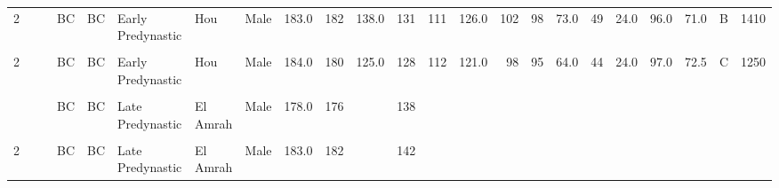 \begin{table}[p]
{\begin{tabular}{rrrlllllrrrrrrrrrrrrrlr}
2 &  &  & BC & BC & Early Predynastic & Hou & Male & 183.0 & 182 & 138.0 & 131 & 111 & 126.0 & 102 & 98 & 73.0 & 49 & 24.0 & 96.0 & 71.0 & B & 1410\\
\cellcolor{gray!10}{2} & \cellcolor{gray!10}{} & \cellcolor{gray!10}{} & \cellcolor{gray!10}{BC} & \cellcolor{gray!10}{BC} & \cellcolor{gray!10}{Early Predynastic} & \cellcolor{gray!10}{Hou} & \cellcolor{gray!10}{Male} & \cellcolor{gray!10}{183.0} & \cellcolor{gray!10}{180} & \cellcolor{gray!10}{140.0} & \cellcolor{gray!10}{137} & \cellcolor{gray!10}{127} & \cellcolor{gray!10}{133.0} & \cellcolor{gray!10}{103} & \cellcolor{gray!10}{103} & \cellcolor{gray!10}{74.0} & \cellcolor{gray!10}{52} & \cellcolor{gray!10}{22.0} & \cellcolor{gray!10}{100.0} & \cellcolor{gray!10}{69.0} & \cellcolor{gray!10}{C} & \cellcolor{gray!10}{1495}\\
2 &  &  & BC & BC & Early Predynastic & Hou & Male & 184.0 & 180 & 125.0 & 128 & 112 & 121.0 & 98 & 95 & 64.0 & 44 & 24.0 & 97.0 & 72.5 & C & 1250\\
\cellcolor{gray!10}{2} & \cellcolor{gray!10}{} & \cellcolor{gray!10}{} & \cellcolor{gray!10}{BC} & \cellcolor{gray!10}{BC} & \cellcolor{gray!10}{Late Predynastic} & \cellcolor{gray!10}{El Amrah} & \cellcolor{gray!10}{Male} & \cellcolor{gray!10}{185.0} & \cellcolor{gray!10}{185} & \cellcolor{gray!10}{138.0} & \cellcolor{gray!10}{124} & \cellcolor{gray!10}{115} & \cellcolor{gray!10}{122.0} & \cellcolor{gray!10}{102} & \cellcolor{gray!10}{101} & \cellcolor{gray!10}{67.0} & \cellcolor{gray!10}{48} & \cellcolor{gray!10}{26.0} & \cellcolor{gray!10}{99.0} & \cellcolor{gray!10}{71.0} & \cellcolor{gray!10}{D} & \cellcolor{gray!10}{1350}\\
\addlinespace
2 &  &  & BC & BC & Late Predynastic & El Amrah & Male & 178.0 & 176 &  & 138 &  &  &  &  &  &  &  &  &  &  & \\
\cellcolor{gray!10}{2} & \cellcolor{gray!10}{} & \cellcolor{gray!10}{} & \cellcolor{gray!10}{BC} & \cellcolor{gray!10}{BC} & \cellcolor{gray!10}{Late Predynastic} & \cellcolor{gray!10}{El Amrah} & \cellcolor{gray!10}{Male} & \cellcolor{gray!10}{189.0} & \cellcolor{gray!10}{187} & \cellcolor{gray!10}{134.0} & \cellcolor{gray!10}{133} & \cellcolor{gray!10}{} & \cellcolor{gray!10}{129.0} & \cellcolor{gray!10}{99} & \cellcolor{gray!10}{97} & \cellcolor{gray!10}{65.0} & \cellcolor{gray!10}{48} & \cellcolor{gray!10}{30.0} & \cellcolor{gray!10}{98.0} & \cellcolor{gray!10}{72.0} & \cellcolor{gray!10}{C D} & \cellcolor{gray!10}{1430}\\
2 &  &  & BC & BC & Late Predynastic & El Amrah & Male & 183.0 & 182 &  & 142 &  &  &  &  &  &  &  &  &  &  & \\

\end{tabular}}
\end{table}
